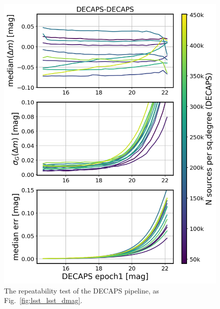 \documentclass[DM,lsstdraft,toc,usenatbib]{lsstdoc}
\begin{document}
\begin{figure}
\begin{centering}
\includegraphics[width=0.8\columnwidth]{figs/decaps-decaps_rms_plot.png}
\caption{The repeatability test of the DECAPS pipeline, as Fig.~\ref{fig:lsst_lsst_dmag}.}
\label{fig:decaps_decaps_dmag}
\end{centering}
\end{figure} 
\end{document}
